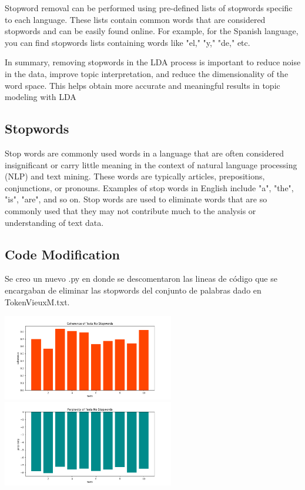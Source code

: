 \documentclass[10pt]{article} %
\begin{document}
	Stopword removal can be performed using pre-defined lists of stopwords specific to each language. These lists contain common words that are considered stopwords and can be easily found online. For example, for the Spanish language, you can find stopwords lists containing words like "el," "y," "de," etc.

	In summary, removing stopwords in the LDA process is important to reduce noise in the data, improve topic interpretation, and reduce the dimensionality of the word space. This helps obtain more accurate and meaningful results in topic modeling with LDA
	
	\subsection{Stopwords}
	
	Stop words are commonly used words in a language that are often considered insignificant or carry little meaning in the context of natural language processing (NLP) and text mining. These words are typically articles, prepositions, conjunctions, or pronouns. Examples of stop words in English include "a", "the", "is", "are", and so on. Stop words are used to eliminate words that are so commonly used that they may not contribute much to the analysis or understanding of text data.
	
	\subsection{Code Modification}
	
	Se creo un nuevo .py en donde se descomentaron las lineas de c\'odigo que se encargaban de eliminar las stopwords del conjunto de palabras dado en TokenVieuxM.txt.
	
	\begin{center}
		\includegraphics[width=7.5cm]{images/coherence_no_stopwords}
		\includegraphics[width=7.5cm]{images/perplexity_no_stopwords}
	\end{center}
\end{document}
